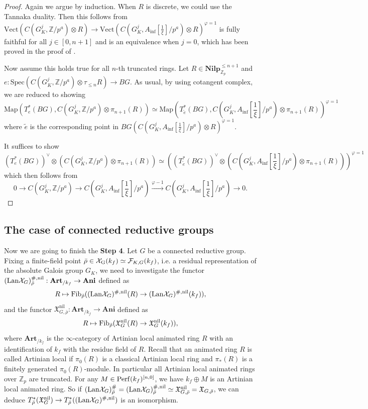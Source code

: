 \documentclass[10pt]{article}
\numberwithin{equation}{section}
\newcommand{\frakX}{{\mathfrak X}}
\newcommand{\bZ}{{\mathbb Z}}
\newcommand{\calF}{{\mathcal F}}
\newcommand{\calX}{{\mathcal X}}
\newcommand{\Lan}{{\mathrm{Lan}}}
\newcommand{\Map}{\mathrm{Map}}
\newcommand{\nil}{\mathrm{nil}}
\newcommand{\Spec}{{\mathrm{Spec}}}         %
\newcommand{\Vect}{{\mathrm{Vect}}}         %
\begin{document}
\begin{proof}
    Again we argue by induction. When $R$ is discrete, we could use the Tannaka duality. Then this follows from $\Vect(C(G_K^j,\bZ/p^a)\otimes R)\to \Vect(C(G_K^j,A_{\inf}[\frac{1}{\xi}]/p^a)\otimes R)^{\varphi=1}$ is fully faithful for all $j\in [0,n+1]$ and is an equivalence when $j=0$, which has been proved in the proof of \cite[Proposition 3.47]{Min23}.

    Now assume this holds true for all $n$-th truncated rings. Let $R\in \textbf{Nilp}_{\bZ_p}^{\leq n+1}$ and $e:\Spec(C(G_K^j,\bZ/p^a)\otimes\tau_{\leq n}R)\to BG$. As usual, by using cotangent complex, we are reduced to showing
    \[
    \Map(T^*_e(BG), C(G_K^j,\bZ/p^a)\otimes\pi_{n+1}(R))\simeq \Map(T^*_{\tilde e}(BG),C(G_K^j,A_{\inf}[\frac{1}{\xi}]/p^a)\otimes\pi_{n+1}(R))^{\varphi=1}
    \]
    where $\tilde e$ is the corresponding point in $BG(C(G_K^j,A_{\inf}[\frac{1}{\xi}]/p^a)\otimes R)^{\varphi=1}$.

    It suffices to show
    \[
      (T^*_e(BG))^\vee\otimes(C(G_K^j,\bZ/p^a)\otimes\pi_{n+1}(R))\simeq ((T^*_{\tilde e}(BG))^\vee\otimes (C(G_K^j,A_{\inf}[\frac{1}{\xi}]/p^a)\otimes\pi_{n+1}(R)))^{\varphi=1}
    \]
    which then follows from \cite[Sequence 3.8]{Min23}
    \[
    0\to C(G_K^j,\bZ/p^a)\to C(G_K^j,A_{\inf}[\frac{1}{\xi}]/p^a)\xrightarrow{\varphi-1}C(G_K^j,A_{\inf}[\frac{1}{\xi}]/p^a)\to 0.
    \]
\end{proof}

\subsection{The case of connected reductive groups}
Now we are going to finish the \textbf{Step 4}. Let $G$ be a connected reductive group. Fixing a finite-field point $\bar \rho\in \calX_{\rm G}(k_f)\simeq \calF_{K,G}(k_f)$, i.e. a residual representation of the absolute Galois group $G_K$, we need to investigate the functor $(\Lan\calX_{G})^{\#,\rm nil}_{\bar \rho}: {{\textbf{Art}}_{/k_f}}\to \textbf{Ani}$ defined as
\[
R\mapsto {\rm Fib}_{\bar \rho}((\Lan\calX_{G})^{\#,\rm nil}(R)\to (\Lan\calX_{G})^{\#,\rm nil}(k_f)),
\]
and the functor $\frakX_{G,\bar \rho}^{\nil}: {{\textbf{Art}}_{/k_f}}\to \textbf{Ani}$ defined as
\[
R\mapsto {\rm Fib}_{\bar \rho}(\frakX_G^{\nil}(R)\to \frakX_G^{\nil}(k_f)),
\]
where ${{\textbf{Art}}_{/k_f}}$ is the $\infty$-category of Artinian local animated ring $R$ with an identification of $k_f$ with the residue field of $R$. Recall that an animated ring $R$ is called Artinian local if $\pi_0(R)$ is a classical Artinian local ring and $\pi_*(R)$ is a finitely generated $\pi_0(R)$-module. In particular all Artinian local animated rings over $\bZ_p$ are truncated. For any $M\in {\rm Perf}(k_f)^{[n,0]}$, we have $k_f\oplus M$ is an Artinian local animated ring. So if $(\Lan\calX_{G})^{\#}_{\bar \rho}=(\Lan\calX_{G})^{\#,\rm nil}_{\bar \rho}\simeq \frakX^{\nil}_{G,\bar \rho}=\frakX_{G,\bar \rho}$, we can deduce $T^*_{\bar \rho}(\frakX_G^{\rm nil})\to T^*_{\bar \rho}((\Lan\calX_{G})^{\#,\rm nil})$ is an isomorphism.
\end{document}

